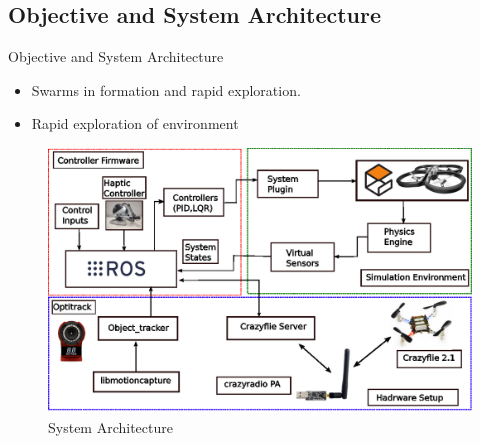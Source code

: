 \documentclass[10pt]{beamer}
\begin{document}
\subsection*{Objective and System Architecture}
\begin{frame}{Objective and System Architecture}
\begin{itemize}
    \item Swarms in formation and rapid exploration.
    \item Rapid exploration of environment
\end{itemize}{}
    \begin{figure}[h!]
        \centering
        \includegraphics[scale=0.7]{System-architecture_final.eps} 
        \vspace{-0.3cm}
        \caption{System Architecture}
        \label{Fig:mas_system}
    \end{figure}

\end{frame}{}
\end{document}
